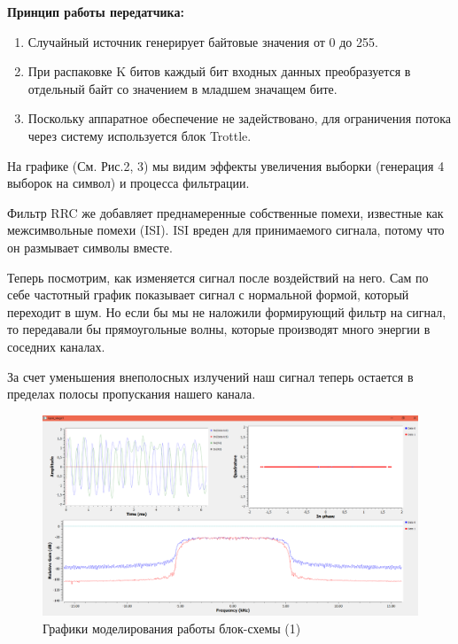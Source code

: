 \documentclass[12pt]{article}
\begin{document}
\textbf{Принцип работы передатчика:}
\begin{enumerate}
	\item Случайный источник генерирует байтовые значения от 0 до 255.
	\item При распаковке K битов каждый бит входных данных преобразуется в отдельный байт со значением в младшем значащем бите. 
	\item Поскольку аппаратное обеспечение не задействовано, для ограничения потока через систему используется блок Trottle.
\end{enumerate}

На графике (См. Рис.2, 3) мы видим эффекты увеличения выборки (генерация 4 выборок на символ) и процесса фильтрации. 

Фильтр RRC же добавляет преднамеренные собственные помехи, известные как межсимвольные помехи (ISI). ISI вреден для принимаемого сигнала, потому что он размывает символы вместе. 

Теперь посмотрим, как изменяется сигнал после воздействий на него. Сам по себе частотный график показывает сигнал с нормальной формой, который переходит в шум. Но если бы мы не наложили формирующий фильтр на сигнал, то передавали бы прямоугольные волны, которые производят много энергии в соседних каналах. 

За счет уменьшения внеполосных излучений наш сигнал теперь остается в пределах полосы пропускания нашего канала.

\begin{figure}[H]
    \centering
    \includegraphics[width=1\textwidth]{pics/a0000-img002.png}
    \caption{Графики моделирования работы блок-схемы (1)}
\end{figure}
\end{document}
